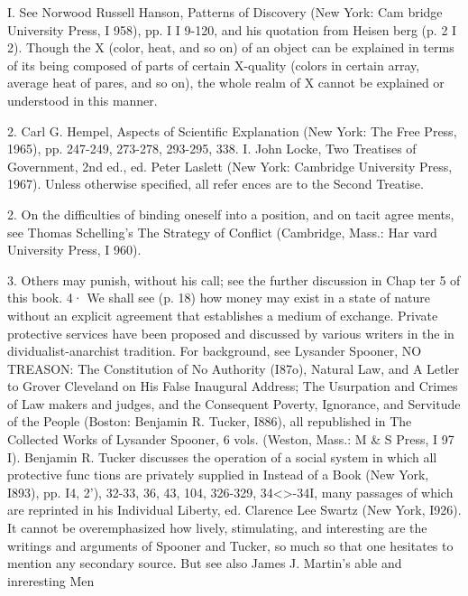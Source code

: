 \documentclass[11pt,openany]{book}
\begin{document}
{\footnotesize\setlength{\parindent}{0pt}\setlength{\parskip}{5pt}

I. See Norwood Russell Hanson, Patterns of Discovery (New York: Cam bridge University Press, I 958), pp. I I 9-120, and his quotation from Heisen berg (p. 2 I 2). Though the X (color, heat, and so on) of an object can be explained in terms of its being composed of parts of certain X-quality (colors in certain array, average heat of pares, and so on), the whole realm of X cannot be explained or understood in this manner.\par

2. Carl G. Hempel, Aspects of Scientific Explanation (New York: The Free Press, 1965), pp. 247-249, 273-278, 293-295, 338. I. John Locke, Two Treatises of Government, 2nd ed., ed. Peter Laslett (New York: Cambridge University Press, 1967). Unless otherwise specified, all refer ences are to the Second Treatise.\par

2. On the difficulties of binding oneself into a position, and on tacit agree ments, see Thomas Schelling's The Strategy of Conflict (Cambridge, Mass.: Har vard University Press, I 960).\par

3. Others may punish, without his call; see the further discussion in Chap ter 5 of this book. 4· We shall see (p. 18) how money may exist in a state of nature without an explicit agreement that establishes a medium of exchange. Private protective services have been proposed and discussed by various writers in the in dividualist-anarchist tradition. For background, see Lysander Spooner, NO TREASON: The Constitution of No Authority (I87o), Natural Law, and A Letler to Grover Cleveland on His False Inaugural Address; The Usurpation and Crimes of Law makers and judges, and the Consequent Poverty, Ignorance, and Servitude of the People (Boston: Benjamin R. Tucker, I886), all republished in The Collected Works of Lysander Spooner, 6 vols. (Weston, Mass.: M \& S Press, I 97 I). Benjamin R. Tucker discusses the operation of a social system in which all protective func tions are privately supplied in Instead of a Book (New York, I893), pp. I4, 2'), 32-33, 36, 43, 104, 326-329, 34<>-34I, many passages of which are reprinted in his Individual Liberty, ed. Clarence Lee Swartz (New York, I926). It cannot be overemphasized how lively, stimulating, and interesting are the writings and arguments of Spooner and Tucker, so much so that one hesitates to mention any secondary source. But see also James J. Martin's able and inreresting Men\par

}
\end{document}
